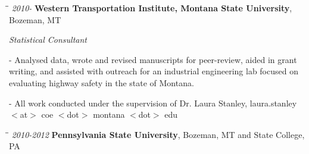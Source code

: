 \documentclass[9pt]{article}
\newenvironment{outerlist}[1][\enskip\textbullet]%
        {\begin{itemize}[#1]}{\end{itemize}%
         }
\newenvironment{innerlist}[1][\enskip\textbullet]%
        {\begin{compactitem}[#1]}{\end{compactitem}}
\begin{document}
  \begin{tabbing}
\hspace*{.25cm}\=\hspace*{.25cm}\= \kill
\hspace{-1.5cm}\footnotesize{\textit{2010- }} \> \textbf{Western Transportation Institute, Montana State University}, 
Bozeman, MT
\end{tabbing}

\begin{outerlist}
	
  \item[] \textit{Statistical Consultant}
  	\begin{innerlist}
						\vspace{.05in}
			\item[-] Analysed data, wrote and revised manuscripts for peer-review, aided in grant writing, and assisted with outreach for an industrial engineering lab focused on evaluating highway safety in the state of Montana.  
      \vspace{.05in}
      \item[-] All work conducted under the supervision of Dr. Laura Stanley, laura.stanley $<$at$>$ coe $<$dot$>$ montana $<$dot$>$ edu

		\end{innerlist}
	\end{outerlist}


\begin{tabbing}
\hspace*{.25cm}\=\hspace*{.25cm}\= \kill
\hspace{-1.5cm}\footnotesize{\textit{2010-2012 }} \> \textbf{Pennsylvania State University}, 
Bozeman, MT and State College, PA
\end{tabbing}
\end{document}
